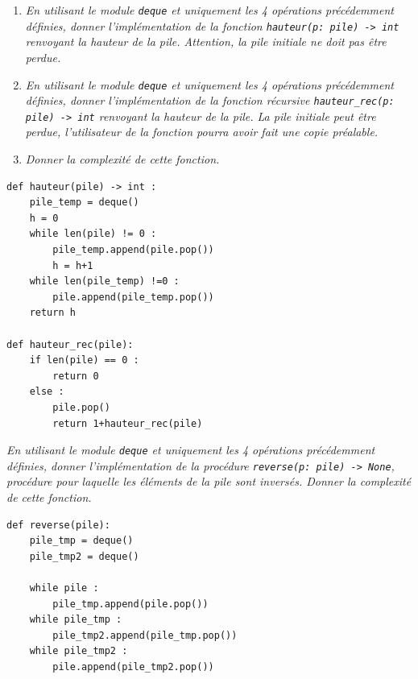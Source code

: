 \begin{exemple}
\begin{enumerate}
\item \textit{En utilisant le module \texttt{deque} et uniquement les 4 opérations précédemment définies, donner l'implémentation de la fonction \texttt{hauteur(p: pile) -> int} renvoyant la hauteur de la pile. Attention, la pile initiale ne doit pas être perdue.}

\item \textit{En utilisant le module \texttt{deque} et uniquement les 4 opérations précédemment définies, donner l'implémentation de la fonction récursive \texttt{hauteur\_rec(p: pile) -> int} renvoyant la hauteur de la pile. La pile initiale peut être perdue, l'utilisateur de la fonction pourra avoir fait  une copie préalable.}

\item \textit{Donner la complexité de cette fonction.}
\end{enumerate}
\ifprof
\begin{lstlisting}
def hauteur(pile) -> int : 
    pile_temp = deque()
    h = 0
    while len(pile) != 0 : 
        pile_temp.append(pile.pop())
        h = h+1
    while len(pile_temp) !=0 : 
        pile.append(pile_temp.pop())
    return h
    
def hauteur_rec(pile):
    if len(pile) == 0 : 
        return 0
    else :
        pile.pop()
        return 1+hauteur_rec(pile)
\end{lstlisting}
\else
\vspace{10cm}
\fi

\end{exemple}



\begin{exemple}
\textit{En utilisant le module \texttt{deque} et uniquement les 4 opérations précédemment définies, donner l'implémentation de la procédure \texttt{reverse(p: pile) -> None}, procédure pour laquelle les éléments de la pile sont inversés. Donner la complexité de cette fonction.}

\begin{lstlisting}
def reverse(pile):
    pile_tmp = deque()
    pile_tmp2 = deque()

    while pile : 
        pile_tmp.append(pile.pop())
    while pile_tmp : 
        pile_tmp2.append(pile_tmp.pop())
    while pile_tmp2 : 
        pile.append(pile_tmp2.pop())
\end{lstlisting}

\end{exemple}


